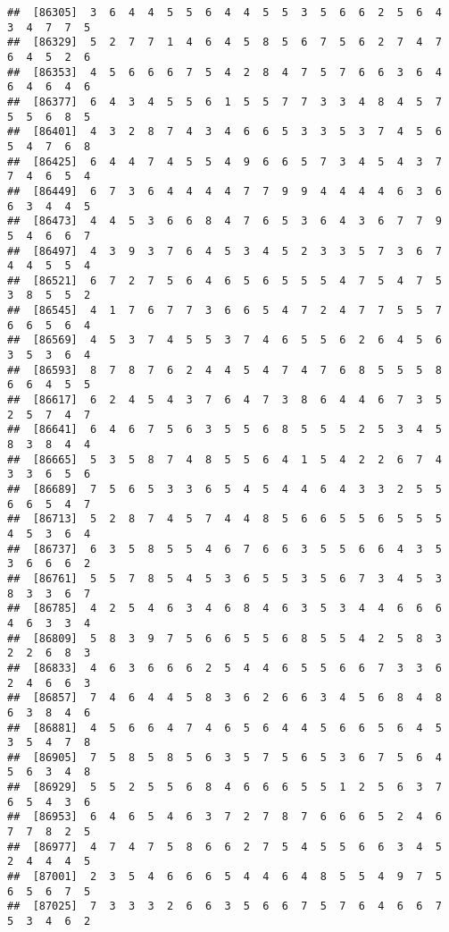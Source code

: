 \documentclass[
]{book}
\begin{document}
\begin{verbatim}
##  [86305]  3  6  4  4  5  5  6  4  4  5  5  3  5  6  6  2  5  6  4  3  4  7  7  5
##  [86329]  5  2  7  7  1  4  6  4  5  8  5  6  7  5  6  2  7  4  7  6  4  5  2  6
##  [86353]  4  5  6  6  6  7  5  4  2  8  4  7  5  7  6  6  3  6  4  6  4  6  4  6
##  [86377]  6  4  3  4  5  5  6  1  5  5  7  7  3  3  4  8  4  5  7  5  5  6  8  5
##  [86401]  4  3  2  8  7  4  3  4  6  6  5  3  3  5  3  7  4  5  6  5  4  7  6  8
##  [86425]  6  4  4  7  4  5  5  4  9  6  6  5  7  3  4  5  4  3  7  7  4  6  5  4
##  [86449]  6  7  3  6  4  4  4  4  7  7  9  9  4  4  4  4  6  3  6  6  3  4  4  5
##  [86473]  4  4  5  3  6  6  8  4  7  6  5  3  6  4  3  6  7  7  9  5  4  6  6  7
##  [86497]  4  3  9  3  7  6  4  5  3  4  5  2  3  3  5  7  3  6  7  4  4  5  5  4
##  [86521]  6  7  2  7  5  6  4  6  5  6  5  5  5  4  7  5  4  7  5  3  8  5  5  2
##  [86545]  4  1  7  6  7  7  3  6  6  5  4  7  2  4  7  7  5  5  7  6  6  5  6  4
##  [86569]  4  5  3  7  4  5  5  3  7  4  6  5  5  6  2  6  4  5  6  3  5  3  6  4
##  [86593]  8  7  8  7  6  2  4  4  5  4  7  4  7  6  8  5  5  5  8  6  6  4  5  5
##  [86617]  6  2  4  5  4  3  7  6  4  7  3  8  6  4  4  6  7  3  5  2  5  7  4  7
##  [86641]  6  4  6  7  5  6  3  5  5  6  8  5  5  5  2  5  3  4  5  8  3  8  4  4
##  [86665]  5  3  5  8  7  4  8  5  5  6  4  1  5  4  2  2  6  7  4  3  3  6  5  6
##  [86689]  7  5  6  5  3  3  6  5  4  5  4  4  6  4  3  3  2  5  5  6  6  5  4  7
##  [86713]  5  2  8  7  4  5  7  4  4  8  5  6  6  5  5  6  5  5  5  4  5  3  6  4
##  [86737]  6  3  5  8  5  5  4  6  7  6  6  3  5  5  6  6  4  3  5  3  6  6  6  2
##  [86761]  5  5  7  8  5  4  5  3  6  5  5  3  5  6  7  3  4  5  3  8  3  3  6  7
##  [86785]  4  2  5  4  6  3  4  6  8  4  6  3  5  3  4  4  6  6  6  4  6  3  3  4
##  [86809]  5  8  3  9  7  5  6  6  5  5  6  8  5  5  4  2  5  8  3  2  2  6  8  3
##  [86833]  4  6  3  6  6  6  2  5  4  4  6  5  5  6  6  7  3  3  6  2  4  6  6  3
##  [86857]  7  4  6  4  4  5  8  3  6  2  6  6  3  4  5  6  8  4  8  6  3  8  4  6
##  [86881]  4  5  6  6  4  7  4  6  5  6  4  4  5  6  6  5  6  4  5  3  5  4  7  8
##  [86905]  7  5  8  5  8  5  6  3  5  7  5  6  5  3  6  7  5  6  4  5  6  3  4  8
##  [86929]  5  5  2  5  5  6  8  4  6  6  6  5  5  1  2  5  6  3  7  6  5  4  3  6
##  [86953]  6  4  6  5  4  6  3  7  2  7  8  7  6  6  6  5  2  4  6  7  7  8  2  5
##  [86977]  4  7  4  7  5  8  6  6  2  7  5  4  5  5  6  6  3  4  5  2  4  4  4  5
##  [87001]  2  3  5  4  6  6  6  5  4  4  6  4  8  5  5  4  9  7  5  6  5  6  7  5
##  [87025]  7  3  3  3  2  6  6  3  5  6  6  7  5  7  6  4  6  6  7  5  3  4  6  2

\end{verbatim}
\end{document}
